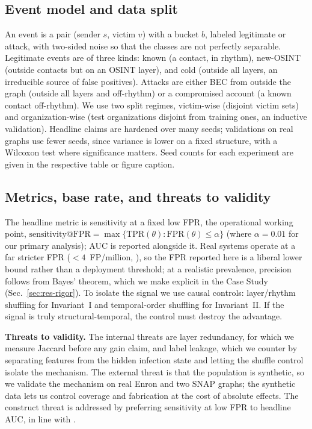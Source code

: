 \subsection{Event model and data split}
\label{sec:m-events}
An event is a pair (sender $s$, victim $v$) with a bucket $b$, labeled legitimate or attack, with two-sided noise so that the classes are not perfectly separable. Legitimate events are of three kinds: known (a contact, in
rhythm), new-OSINT (outside contacts but on an OSINT layer), and cold (outside all layers, an irreducible source
of false positives). Attacks are either BEC from outside the graph (outside all layers and off-rhythm) or a
compromised account (a known contact off-rhythm). We use two split regimes, victim-wise (disjoint victim sets) and
organization-wise (test organizations disjoint from training ones, an inductive validation). Headline claims are
hardened over many seeds; validations on real graphs use fewer seeds, since variance is lower on a fixed
structure, with a Wilcoxon test where significance matters. Seed counts for each experiment are given in the
respective table or figure caption.

\subsection{Metrics, base rate, and threats to validity}
\label{sec:m-metrics}
The headline metric is sensitivity at a fixed low FPR, the operational working point,
$\text{sensitivity}@\mathrm{FPR} = \max\{\mathrm{TPR}(\theta):\mathrm{FPR}(\theta)\le\alpha\}$ (where $\alpha=0.01$ for our primary analysis); AUC is reported
alongside it. Real systems operate at a far stricter FPR ($<\!4$~FP/million, \citep{ho2019detecting}), so the FPR
reported here is a liberal lower bound rather than a deployment threshold; at a realistic prevalence, precision
follows from Bayes' theorem, which we make explicit in the Case Study (Sec.~\ref{sec:res-rigor}). To isolate the
signal we use causal controls: layer/rhythm shuffling for Invariant~I and temporal-order shuffling for
Invariant~II. If the signal is truly structural-temporal, the control must destroy the advantage.

\smallskip\noindent\textbf{Threats to validity.} The internal threats are layer redundancy, for which we measure
Jaccard before any gain claim, and label leakage, which we counter by separating features from the hidden
infection state and letting the shuffle control isolate the mechanism. The external threat is that the population
is synthetic, so we validate the mechanism on real Enron and two SNAP graphs; the synthetic data lets us control
coverage and fabrication at the cost of absolute effects. The construct threat is addressed by preferring
sensitivity at low FPR to headline AUC, in line with \citep{arp2022dos,pendlebury2019tesseract}.
